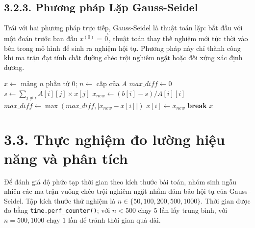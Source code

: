 \subsection*{3.2.3. Phương pháp Lặp Gauss-Seidel}
{}

Trái với hai phương pháp trực tiếp, Gauss-Seidel là thuật toán lặp: bắt đầu với một đoán trước ban đầu $x^{(0)} = \vec{0}$, thuật toán thay thế nghiệm mới tức thời vào bên trong mô hình để sinh ra nghiệm hội tụ. Phương pháp này chỉ thành công khi ma trận đạt tính chất đường chéo trội nghiêm ngặt hoặc đối xứng xác định dương.

\begin{algorithm}[H]
\caption{Giải hệ phương trình bằng Lặp Gauss-Seidel}
\label{alg:gauss_seidel}
\begin{algorithmic}[1]
    \State $x \gets$ mảng $n$ phần tử 0; $n \gets$ cấp của $A$
        \State $max\_diff \gets 0$
            \State $s \gets \sum_{j \neq i} A[i][j] \times x[j]$
            \State $x_{new} \gets (b[i] - s) / A[i][i]$
            \State $max\_diff \gets \max(max\_diff, |x_{new} - x[i]|)$
            \State $x[i] \gets x_{new}$
        \EndFor
            \State \textbf{break} 
        \EndIf
    \EndFor
    \State \Return $x$
\EndProcedure
\end{algorithmic}
\end{algorithm}

\section*{3.3. Thực nghiệm đo lường hiệu năng và phân tích}
{}

Để đánh giá độ phức tạp thời gian theo kích thước bài toán, nhóm sinh ngẫu nhiên các ma trận vuông chéo trội nghiêm ngặt nhằm đảm bảo hội tụ của Gauss--Seidel. Tập kích thước thử nghiệm là $n \in \{50, 100, 200, 500, 1000\}$. Thời gian được đo bằng \texttt{time.perf\_counter()}; với $n < 500$ chạy $5$ lần lấy trung bình, với $n = 500, 1000$ chạy $1$ lần để tránh thời gian quá dài.

